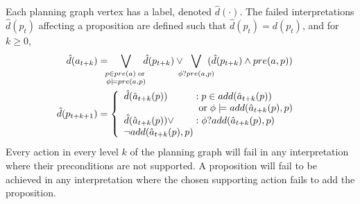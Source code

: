 \documentclass[letterpaper]{article}
\begin{document}
 Each planning graph vertex has a label, denoted $\hat{d}(\cdot)$.  The failed
 interpretations $\hat{d}(p_t) $ affecting a proposition are defined such that
 $\hat{d}(p_t) = d(p_t)$, and for $k \geq 0$,
\begin{align}
\hat{d}({a}_{t+k}) &= \hspace*{-.2cm}
\bigvee\limits_{\substack{p \in pre({a}) \;\text{or}\;\\ \phi\models
pre(a, p) }} \hspace*{-.2cm}
\hat{d}(p_{t+k}) \vee \hspace*{-.25cm} \bigvee\limits_{\phi?pre(a, p)}
\hspace*{-.25cm} (\hat{d}(p_{t+k})  \wedge pre({a}, p) )\notag\\ \notag
\hspace*{-.6cm} \hat{d}(p_{t+k+1}) &= \left\{\begin{array}{l@{\;}l@{\;}r} \hat{d}(\hat{a}_{t+k}(p)) & : p \in add(\hat{a}_{t+k}(p))\\
 & \;\text{or}\; \phi\models
add(\hat{a}_{t+k}(p), p)\\
\hat{d}(\hat{a}_{t+k}(p)) \vee& : \phi?add(\hat{a}_{t+k}(p), p)\\
\neg add(\hat{a}_{t+k}(p), p)
\end{array}\right. \hspace*{-.1cm}\label{eqn:hprop}
\end{align}
Every action in every level $k$ of the planning graph will fail in any
interpretation where their preconditions are not supported.  A proposition will
fail  to be achieved in any interpretation where the chosen supporting action
fails to add the proposition.

\end{document}

